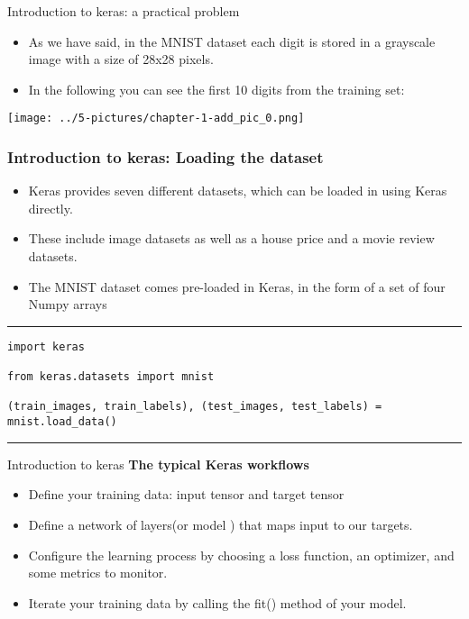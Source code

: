 \documentclass[11pt]{beamer}
\begin{document}
\begin{frame}{Introduction to keras: a practical problem}
	\begin{itemize}
		\item As we have said, in the MNIST dataset each digit is stored in a grayscale image with a size of 28x28 pixels. 
		\item In the following you can see the first 10 digits from the training set:
	\end{itemize}
	\begin{center}
	\texttt{[image: ../5-pictures/chapter-1-add\_pic\_0.png]}
	\end{center}
\end{frame}
\begin{frame}[fragile]
\frametitle{Introduction to keras: Loading the dataset}
\begin{itemize}
\item Keras provides seven different datasets, which can be loaded in using Keras directly. 
\item These include image datasets as well as a house price and a movie review datasets.
\item The MNIST dataset comes pre-loaded in Keras, in the form of a set of four Numpy arrays
\end{itemize}
\rule{\textwidth}{1pt}
\scriptsize
\begin{verbatim}
import keras

from keras.datasets import mnist

(train_images, train_labels), (test_images, test_labels) = mnist.load_data()

\end{verbatim}
\rule{\textwidth}{1pt}
\end{frame}
\begin{frame}{Introduction to keras}
\textbf{The typical Keras workflows}
\vspace{0.5cm}
	\begin{itemize}
		\item Define your training data: input tensor and target tensor
		\item Define a network of layers(or model ) that maps input to our targets.
		\item Configure the learning process by choosing a loss function, an optimizer, and some metrics to monitor.
		\item Iterate your training data by calling the fit() method of your model.
	\end{itemize}
\end{frame}
\end{document}
